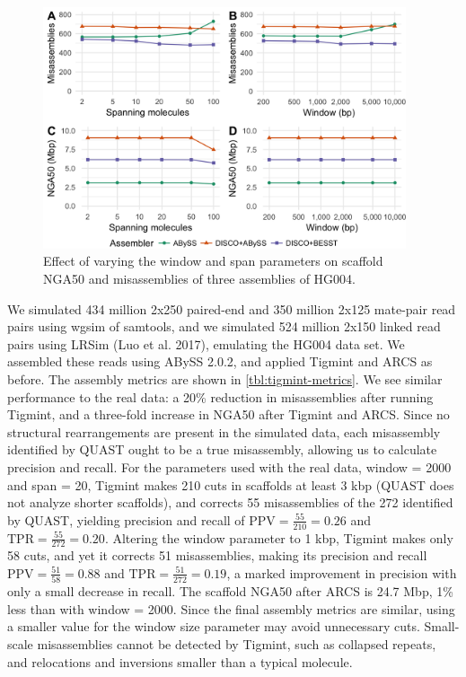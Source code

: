 \documentclass[
  12pt,
  oneside,
  openany]{book}
\begin{document}
\begin{figure}
\hypertarget{fig:parameters}{%
\centering
\includegraphics[width=\textwidth,height=2.8in]{tigmint/parameters.png}
\caption[Effect of varying the window and span parameters on scaffold NGA50 and misassemblies of three assemblies of HG004.]{Effect of varying the window and span parameters on scaffold NGA50 and misassemblies of three assemblies of HG004.}\label{fig:parameters}
}
\end{figure}

We simulated 434 million 2x250 paired-end and 350 million 2x125 mate-pair read pairs using wgsim of samtools, and we simulated 524 million 2x150 linked read pairs using LRSim (Luo et al. 2017), emulating the HG004 data set. We assembled these reads using ABySS 2.0.2, and applied Tigmint and ARCS as before. The assembly metrics are shown in \cref{tbl:tigmint-metrics}. We see similar performance to the real data: a 20\% reduction in misassemblies after running Tigmint, and a three-fold increase in NGA50 after Tigmint and ARCS. Since no structural rearrangements are present in the simulated data, each misassembly identified by QUAST ought to be a true misassembly, allowing us to calculate precision and recall. For the parameters used with the real data, window = 2000 and span = 20, Tigmint makes 210 cuts in scaffolds at least 3 kbp (QUAST does not analyze shorter scaffolds), and corrects 55 misassemblies of the 272 identified by QUAST, yielding precision and recall of \(\textrm{PPV} = \frac{55}{210} = 0.26\) and \(\textrm{TPR} = \frac{55}{272} = 0.20\). Altering the window parameter to 1 kbp, Tigmint makes only 58 cuts, and yet it corrects 51 misassemblies, making its precision and recall \(\textrm{PPV} = \frac{51}{58} = 0.88\) and \(\textrm{TPR} = \frac{51}{272} = 0.19\), a marked improvement in precision with only a small decrease in recall. The scaffold NGA50 after ARCS is 24.7 Mbp, 1\% less than with window = 2000. Since the final assembly metrics are similar, using a smaller value for the window size parameter may avoid unnecessary cuts. Small-scale misassemblies cannot be detected by Tigmint, such as collapsed repeats, and relocations and inversions smaller than a typical molecule.
\end{document}
